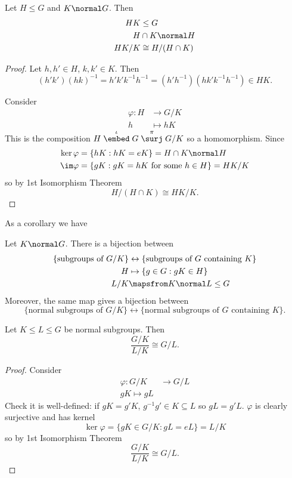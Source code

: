 \documentclass[a4paper]{article}
\theoremstyle{definition}
\begin{document}
\begin{theorem}
  Let \(H \leq G\) and \(K \normal G\). Then
  \begin{align*}
    HK &\leq G \\
    H &\cap K \normal H \\
    HK/K &\cong H/(H \cap K)
  \end{align*}
\end{theorem}

\begin{proof}
  Let \(h, h' \in H\), \(k, k' \in K\). Then
  \[
    (h'k')(hk)^{-1} = h'k'k^{-1}h^{-1} = (h'h^{-1})(hk'k^{-1}h^{-1}) \in HK.
  \]

  Consider
  \begin{align*}
    \varphi: H &\to G/K \\
    h &\mapsto hK
  \end{align*}
  This is the composition \(H \stackrel{\iota}{\embed} G \stackrel{\pi}{\surj} G/K\) so a homomorphism. Since
  \begin{align*}
    \ker \varphi &= \{hK: hK = eK\} = H \cap K \normal H \\
    \im \varphi &= \{gK: gK = hK \text{ for some } h \in H\} = HK/K
  \end{align*}
  so by 1st Isomorphism Theorem
  \[
    H/(H \cap K) \cong HK/K.
  \]
\end{proof}

As a corollary we have

\begin{theorem}
  Let \(K \normal G\). There is a bijection between
  \begin{align*}
    \{\text{subgroups of } G/K\} &\leftrightarrow \{\text{subgroups of \(G\) containing \(K\)}\} \\
    H &\mapsto \{g \in G: gK \in H\} \\
    L/K &\mapsfrom K \normal L \leq G
  \end{align*}
  Moreover, the same map gives a bijection between
  \[
    \{\text{normal subgroups of } G/K\} \leftrightarrow \{\text{normal subgroups of \(G\) containing \(K\)}\}.
  \]
\end{theorem}

\begin{theorem}
  Let \(K \leq L \leq G\) be normal subgroups. Then
  \[
    \frac{G/K}{L/K} \cong G/L.
  \]
\end{theorem}

\begin{proof}
  Consider
  \begin{align*}
    \varphi: G/K &\to G/L \\
    gK \mapsto gL
  \end{align*}
  Check it is well-defined: if \(gK = g'K\), \(g^{-1}g' \in K \subseteq L\) so \(gL = g'L\). \(\varphi\) is clearly surjective and has kernel
  \[
    \ker \varphi = \{gK \in G/K: gL = eL\} = L/K
  \]
  so by 1st Isomorphism Theorem
  \[
    \frac{G/K}{L/K} \cong G/L.
  \]
\end{proof}
\end{document}
